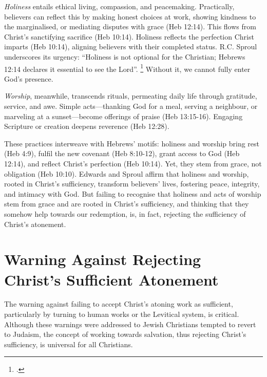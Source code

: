 \documentclass[12pt]{article}
\begin{document}
\emph{Holiness} entails ethical living, compassion, and peacemaking.
%
Practically, believers can reflect this by making honest choices at work,
showing kindness to the marginalised, or mediating disputes with grace (Heb
12:14).
%
This flows from Christ’s sanctifying sacrifice (Heb 10:14).
%
Holiness reflects the perfection Christ imparts (Heb 10:14), aligning believers
with their completed status.
%
R.C. Sproul underscores its urgency: ``Holiness is not optional for the
Christian; Hebrews 12:14 declares it essential to see the Lord''.
\footcite[112]{Sproul1985}
%
Without it, we cannot fully enter God’s presence.

\emph{Worship}, meanwhile, transcends rituals, permeating daily life through
gratitude, service, and awe.
%
Simple acts---thanking God for a meal, serving a neighbour, or marveling at a
sunset---become offerings of praise (Heb 13:15-16).
%
Engaging Scripture or creation deepens reverence (Heb 12:28).

These practices interweave with Hebrews’ motifs: holiness and worship bring rest
(Heb 4:9), fulfil the new covenant (Heb 8:10-12), grant access to God
(Heb 12:14), and reflect Christ’s perfection (Heb 10:14). Yet, they stem
from grace, not obligation (Heb 10:10). Edwards and Sproul affirm that
holiness and worship, rooted in Christ’s sufficiency, transform believers’
lives, fostering peace, integrity, and intimacy with God. But failing to
recognise that holiness and acts of worship stem from grace and are rooted in
Christ’s sufficiency, and thinking that they somehow help towards our
redemption, is, in fact, rejecting the sufficiency of Christ's atonement.

\section{Warning Against Rejecting Christ’s Sufficient Atonement}
The warning against failing to accept Christ’s atoning work as sufficient,
particularly by turning to human works or the Levitical system, is critical.
%
Although these warnings were addressed to Jewish Christians tempted to revert to
Judaism, the concept of working towards salvation, thus rejecting Christ’s
sufficiency, is universal for all Christians.
\end{document}
